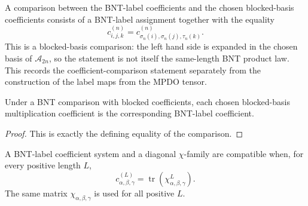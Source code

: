 \begin{definition}%
    \label{def:mpdo_bnt_blocked_basis_coefficient_comparison}
    \leanok
    A comparison between the BNT-label coefficients and the chosen
    blocked-basis coefficients consists of a BNT-label assignment together
    with the equality
    \[
        c^{(n)}_{i,j,k}
        =
        c^{(n)}_{\sigma_n(i),\sigma_n(j),\tau_n(k)}.
    \]
    This is a blocked-basis comparison: the left hand side is expanded in the
    chosen basis of $\mathcal A_{2n}$, so the statement is not itself the
    same-length BNT product law.
    This records the coefficient-comparison statement separately from the
    construction of the label maps from the MPDO tensor.
\end{definition}

\begin{theorem}%
    \label{thm:mpdo_bnt_blocked_basis_coefficient_eq}
    \leanok
    Under a BNT comparison with blocked coefficients, each chosen blocked-basis
    multiplication coefficient is the corresponding BNT-label coefficient.
\end{theorem}
\begin{proof}\leanok
    This is exactly the defining equality of the comparison.
\end{proof}

\begin{definition}%
    \label{def:mpdo_bnt_label_positive_length_chi_trace_power_form}
    \leanok
    A BNT-label coefficient system and a diagonal $\chi$-family are
    compatible when, for every positive length $L$,
    \[
        c^{(L)}_{\alpha,\beta,\gamma}
        = \operatorname{tr}(\chi_{\alpha,\beta,\gamma}^{L}).
    \]
    The same matrix $\chi_{\alpha,\beta,\gamma}$ is used for all positive
    $L$.
\end{definition}

